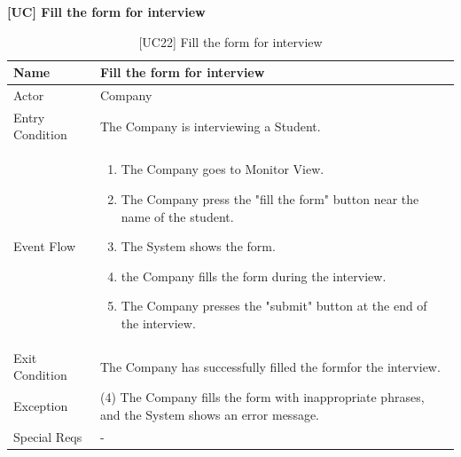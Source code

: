 \textbf{[UC\nextUseCases] Fill the form for interview}
\begin{table}[H] %
    \centering
    \begin{tabular}{|p{3cm}|p{10cm}|}
    \hline
    Name & Fill the form for interview \\ \hline
    Actor  & Company \\ \hline
    Entry Condition  & The Company is interviewing a Student. \\ \hline
    Event Flow  & 
    \begin{enumerate}[noitemsep, topsep=0pt]
        \item The Company goes to Monitor View.
        \item The Company press the "fill the form" button near the name of the student.
        \item The System shows the form.
        \item the Company fills the form during the interview.
        \item The Company presses the "submit" button at the end of the interview.
    \end{enumerate}
    \\ \hline
    Exit Condition  & The Company has successfully filled the formfor the interview. \\ \hline
    Exception  & (4) The Company fills the form with inappropriate phrases, and the System shows an error message. \\ \hline
    Special Reqs  & -  \\ \hline
    \end{tabular}
    \caption{[UC22] Fill the form for interview}
\end{table}

